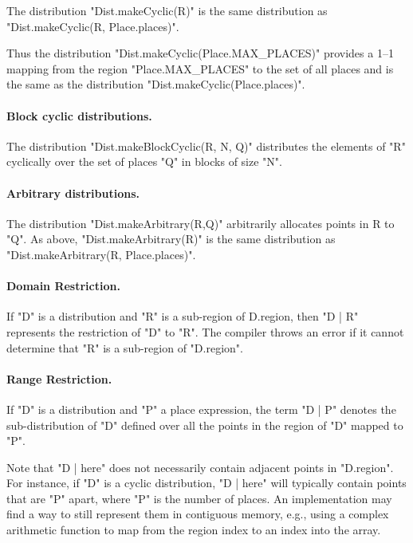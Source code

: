 The distribution \xcd"Dist.makeCyclic(R)" is the same distribution as
\xcd"Dist.makeCyclic(R, Place.places)". 

Thus the distribution \xcd"Dist.makeCyclic(Place.MAX_PLACES)" provides a 1--1
mapping from the region \xcd"Place.MAX_PLACES" to the set of all
places and is the same as the distribution \xcd"Dist.makeCyclic(Place.places)".

\paragraph{Block cyclic distributions.}
The distribution \xcd"Dist.makeBlockCyclic(R, N, Q)" distributes the elements
of \xcd"R" cyclically over the set of places \xcd"Q" in blocks of size
\xcd"N".

\paragraph{Arbitrary distributions.} 
The distribution \xcd"Dist.makeArbitrary(R,Q)" arbitrarily allocates points in {\cf
R} to \xcd"Q". As above, \xcd"Dist.makeArbitrary(R)" is the same distribution as
\xcd"Dist.makeArbitrary(R, Place.places)".


\paragraph{Domain Restriction.} 

If \xcd"D" is a distribution and \xcd"R" is a sub-region of {\cf
D.region}, then \xcd"D | R" represents the restriction of \xcd"D" to
\xcd"R".  The compiler throws an error if it cannot determine that
\xcd"R" is a sub-region of \xcd"D.region".

\paragraph{Range Restriction.}

If \xcd"D" is a distribution and \xcd"P" a place expression, the term
\xcd"D | P" denotes the sub-distribution of \xcd"D" defined over all the
points in the region of \xcd"D" mapped to \xcd"P".

Note that \xcd"D | here" does not necessarily contain adjacent points
in \xcd"D.region". For instance, if \xcd"D" is a cyclic distribution,
\xcd"D | here" will typically contain points that are \xcd"P" apart,
where \xcd"P" is the number of places. An implementation may find a
way to still represent them in contiguous memory, e.g., using a
complex arithmetic function to map from the region index to an index
into the array.

